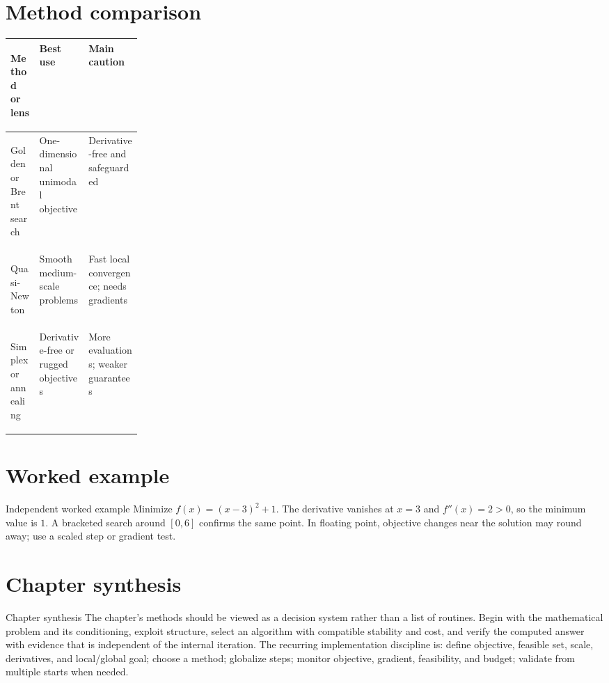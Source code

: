 \documentclass[10pt,letterpaper]{article}
\begin{document}
\section*{Method comparison}
\begin{center}
\small
\begin{tabularx}{\linewidth}{>{\bfseries\raggedright\arraybackslash}p{0.22\linewidth}XX}
\toprule
Method or lens & Best use & Main caution \\
\midrule
Golden or Brent search & One-dimensional unimodal objective & Derivative-free and safeguarded \\
Quasi-Newton & Smooth medium-scale problems & Fast local convergence; needs gradients \\
Simplex or annealing & Derivative-free or rugged objectives & More evaluations; weaker guarantees \\
\bottomrule
\end{tabularx}
\end{center}

\section*{Worked example}
\begin{exambox}{Independent worked example}
Minimize $f(x)=(x-3)^2+1$.  The derivative vanishes at $x=3$ and $f''(x)=2>0$, so the minimum value is $1$.  A bracketed search around $[0,6]$ confirms the same point.  In floating point, objective changes near the solution may round away; use a scaled step or gradient test.
\end{exambox}

\section*{Chapter synthesis}
\begin{summarybox}{Chapter synthesis}
The chapter's methods should be viewed as a decision system rather than a list of routines.  Begin with the mathematical problem and its conditioning, exploit structure, select an algorithm with compatible stability and cost, and verify the computed answer with evidence that is independent of the internal iteration.  The recurring implementation discipline is: define objective, feasible set, scale, derivatives, and local/global goal; choose a method; globalize steps; monitor objective, gradient, feasibility, and budget; validate from multiple starts when needed.
\end{summarybox}
\end{document}
